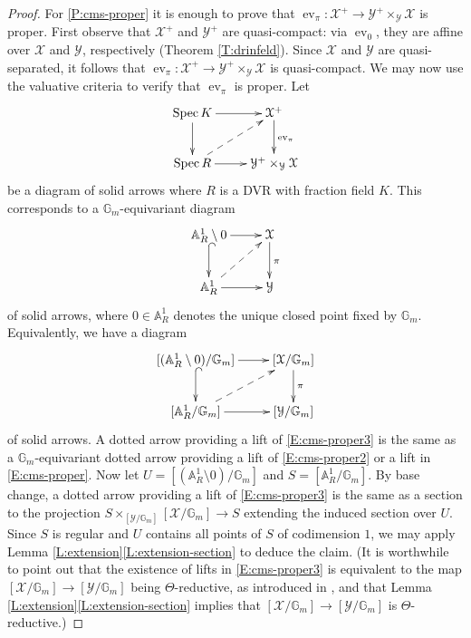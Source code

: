 \documentclass[a4paper]{amsart}
\theoremstyle{plain}
\theoremstyle{definition}
\theoremstyle{remark}
\numberwithin{equation}{section}
\newcommand{\GG}{\mathbb{G}}
\renewcommand\AA{\mathbb{A}}
\newcommand\cX{\mathcal{X}}
\newcommand\cY{\mathcal{Y}}
\DeclareMathOperator{\Spec}{Spec}
\DeclareMathOperator{\ev}{ev}
\begin{document}
\begin{proof}
For \eqref{P:cms-proper} it is enough to prove that $\ev_\pi\colon
\cX^+ \to \cY^+\times_\cY \cX$ is proper. First observe that $\cX^+$ and $\cY^+$ are quasi-compact: via $\ev_0$, they are affine over $\cX$ and $\cY$, respectively (Theorem \ref{T:drinfeld}).  Since $\cX$ and $\cY$ are quasi-separated, it follows that $\ev_\pi \colon \cX^+ \to \cY^+\times_{\cY} \cX$ is quasi-compact. We may now use the valuative criteria to verify that $\ev_\pi$ is proper.  Let
\begin{equation} \label{E:cms-proper}
\begin{split}
\xymatrix{
\Spec K \ar[d] \ar[r]	& \cX^+ \ar[d]^{\ev_\pi} \\
\Spec R \ar[r] \ar@{-->}[ur]	& \cY^+\times_\cY \cX
}
\end{split} 
\end{equation}
be a diagram of solid arrows where $R$ is a DVR with fraction field $K$.   This corresponds to a $\GG_m$-equivariant diagram
\begin{equation} \label{E:cms-proper2}
\begin{split}
\xymatrix{
\AA^1_R \setminus 0 \ar[r]	\ar@{^(->}[d]	& \cX \ar[d]^{\pi} \\
\AA^1_R \ar[r]	\ar@{-->}[ur]			& \cY
}
\end{split} 
\end{equation}
of solid arrows, where $0 \in \AA^1_R$ denotes the unique closed point fixed by $\GG_m$. Equivalently, we have a diagram
\begin{equation} \label{E:cms-proper3}
\begin{split}
\xymatrix{
[(\AA^1_R \setminus 0)/\GG_m] \ar[r]	\ar@{^(->}[d]	& [\cX/\GG_m] \ar[d]^{\pi} \\
[\AA^1_R/\GG_m] \ar[r]	\ar@{-->}[ur]			& [\cY/\GG_m]
}
\end{split} 
\end{equation}
of solid arrows. A dotted arrow providing a lift of \eqref{E:cms-proper3} is the same as a $\GG_m$-equivariant dotted arrow providing a lift of \eqref{E:cms-proper2} or a lift in \eqref{E:cms-proper}. Now let $U=[(\AA_R^1\setminus 0)/\GG_m]$ and $S= [\AA^1_R/\GG_m]$. By base change, a dotted arrow providing a lift of \eqref{E:cms-proper3} is the same as a section to the projection $S\times_{[\cY/\GG_m]}[\cX/\GG_m] \to S$ extending the induced section over $U$. Since $S$ is regular and $U$ contains all points of $S$ of codimension $1$, we may apply Lemma \ref{L:extension}\eqref{L:extension-section} to deduce the claim. (It is worthwhile to point out that the existence of lifts in \eqref{E:cms-proper3} is equivalent to the map $[\cX/\GG_m] \to [\cY/\GG_m]$ being $\Theta$-reductive, as introduced in \cite{dhl-instability}, and that Lemma \ref{L:extension}\eqref{L:extension-section}  implies that $[\cX/\GG_m] \to [\cY/\GG_m]$  is $\Theta$-reductive.)


\end{proof}
\end{document}
